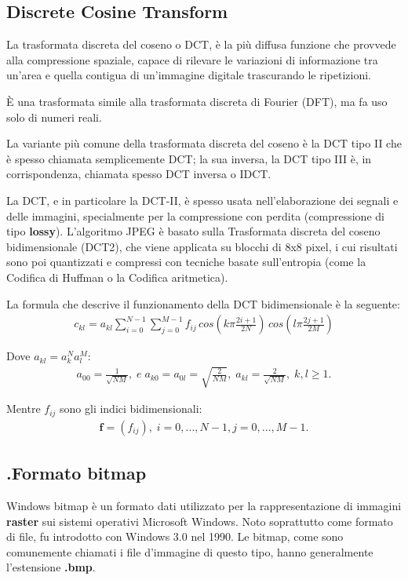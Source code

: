 \documentclass[preprint,12pt]{elsarticle}
\begin{document}
\subsection{Discrete Cosine Transform}
La trasformata discreta del coseno o DCT, è la più diffusa funzione che provvede alla compressione spaziale, capace di rilevare le variazioni di informazione tra un'area e quella contigua di un'immagine digitale trascurando le ripetizioni.

È una trasformata simile alla trasformata discreta di Fourier (DFT), ma fa uso solo di numeri reali.

La variante più comune della trasformata discreta del coseno è la DCT tipo II che è spesso chiamata semplicemente DCT; la sua inversa, la DCT tipo III è, in corrispondenza, chiamata spesso DCT inversa o IDCT. 

La DCT, e in particolare la DCT-II, è spesso usata nell'elaborazione dei segnali e delle immagini, specialmente per la compressione con perdita (compressione di tipo \textbf{lossy}). L'algoritmo JPEG è basato sulla Trasformata discreta del coseno bidimensionale (DCT2), che viene applicata su blocchi di 8x8 pixel, i cui risultati sono poi quantizzati e compressi con tecniche basate sull'entropia (come la Codifica di Huffman o la Codifica aritmetica).

\bigskip
La formula che descrive il funzionamento della DCT bidimensionale è la seguente:
\begin{eqnarray*}
c_{kl} = a_{kl} \sum_{i=0}^{N-1} \sum_{j=0}^{M-1} f_{ij} \,  cos\left(k\pi \frac{2i+1}{2N}\right) \, cos\left(l\pi \frac{2j+1}{2M}\right)
\end{eqnarray*}

Dove $a_{kl} = a_{k}^{N} a_{l}^{M}$:
\begin{eqnarray*}
a_{00} = \frac{1}{\sqrt{NM}},\; e \; a_{k0} = a_{0l} = \sqrt{\frac{2}{NM}},\; a_{kl} = \frac{2}{\sqrt{NM}}, \; k, l \geq 1.
\end{eqnarray*}

Mentre $f_{ij}$ sono gli indici bidimensionali:
\begin{eqnarray*}
\textbf{f} = (f_{ij}), \; i=0, ..., N-1, j=0, ..., M-1.
\end{eqnarray*}

\subsection{.Formato bitmap}
Windows bitmap è un formato dati utilizzato per la rappresentazione di immagini \textbf{raster} sui sistemi operativi Microsoft Windows. Noto soprattutto come formato di file, fu introdotto con Windows 3.0 nel 1990.
Le bitmap, come sono comunemente chiamati i file d'immagine di questo tipo, hanno generalmente l'estensione \textbf{.bmp}.
\end{document}
